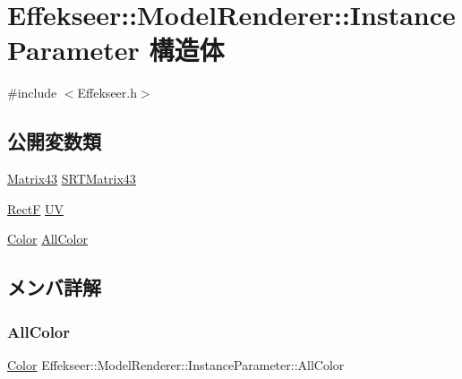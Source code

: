 \hypertarget{struct_effekseer_1_1_model_renderer_1_1_instance_parameter}{}\section{Effekseer\+:\+:Model\+Renderer\+:\+:Instance\+Parameter 構造体}
\label{struct_effekseer_1_1_model_renderer_1_1_instance_parameter}


{\ttfamily \#include $<$Effekseer.\+h$>$}

\subsection*{公開変数類}
\begin{DoxyCompactItemize}
\item 
\mbox{\hyperlink{struct_effekseer_1_1_matrix43}{Matrix43}} \mbox{\hyperlink{struct_effekseer_1_1_model_renderer_1_1_instance_parameter_a9f939c1f03b94d5c76eea7c7ff461da3}{S\+R\+T\+Matrix43}}
\item 
\mbox{\hyperlink{struct_effekseer_1_1_rect_f}{RectF}} \mbox{\hyperlink{struct_effekseer_1_1_model_renderer_1_1_instance_parameter_a8093686e2945cecdfcb99420bacca07d}{UV}}
\item 
\mbox{\hyperlink{struct_effekseer_1_1_color}{Color}} \mbox{\hyperlink{struct_effekseer_1_1_model_renderer_1_1_instance_parameter_a5d22e2c41cd40b037704fc7c41d7688a}{All\+Color}}
\end{DoxyCompactItemize}


\subsection{メンバ詳解}
\mbox{\label{struct_effekseer_1_1_model_renderer_1_1_instance_parameter_a5d22e2c41cd40b037704fc7c41d7688a}} 
\subsubsection{\texorpdfstring{All\+Color}{AllColor}}
{\footnotesize\ttfamily \mbox{\hyperlink{struct_effekseer_1_1_color}{Color}} Effekseer\+::\+Model\+Renderer\+::\+Instance\+Parameter\+::\+All\+Color}

